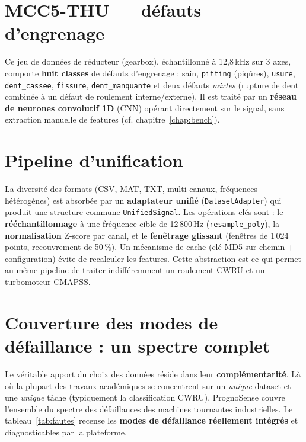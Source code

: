 \section{MCC5-THU --- défauts d'engrenage}
Ce jeu de données de réducteur (gearbox), échantillonné à 12{,}8\,kHz sur 3 axes, comporte
\textbf{huit classes} de défauts d'engrenage : sain, \texttt{pitting} (piqûres),
\texttt{usure}, \texttt{dent\_cassee}, \texttt{fissure}, \texttt{dent\_manquante} et deux
défauts \emph{mixtes} (rupture de dent combinée à un défaut de roulement interne/externe).
Il est traité par un \textbf{réseau de neurones convolutif 1D} (CNN) opérant directement sur
le signal, sans extraction manuelle de features (cf. chapitre~\ref{chap:bench}).

\section{Pipeline d'unification}
La diversité des formats (CSV, MAT, TXT, multi-canaux, fréquences hétérogènes) est absorbée
par un \textbf{adaptateur unifié} (\texttt{DatasetAdapter}) qui produit une structure
commune \texttt{UnifiedSignal}. Les opérations clés sont : le \textbf{rééchantillonnage} à
une fréquence cible de 12\,800\,Hz (\texttt{resample\_poly}), la \textbf{normalisation}
Z-score par canal, et le \textbf{fenêtrage glissant} (fenêtres de 1\,024 points, recouvrement
de 50\,\%). Un mécanisme de cache (clé MD5 sur chemin + configuration) évite de recalculer
les features. Cette abstraction est ce qui permet au même pipeline de traiter indifféremment
un roulement CWRU et un turbomoteur CMAPSS.

\section{Couverture des modes de défaillance : un spectre complet}
\label{sec:couverture}
Le véritable apport du choix des données réside dans leur \textbf{complémentarité}. Là où
la plupart des travaux académiques se concentrent sur un \emph{unique} dataset et une
\emph{unique} tâche (typiquement la classification CWRU), PrognoSense couvre l'ensemble du
spectre des défaillances des machines tournantes industrielles. Le
tableau~\ref{tab:fautes} recense les \textbf{modes de défaillance réellement intégrés} et
diagnosticables par la plateforme.

